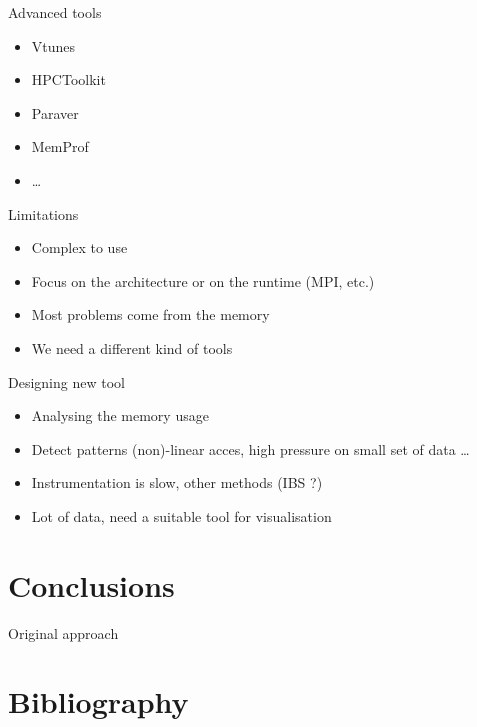 \documentclass[xcolor={usenames,dvipsnames}]{beamer}
\newcommand{\sectiontitle}{}
\newcommand{\newsection}[1]{\renewcommand{\sectiontitle}{#1}\section{#1}}
\newcommand{\newHsection}[1]{\renewcommand{\sectiontitle}{#1}\section*{#1}}
\begin{document}
\begin{frame}{Advanced tools}
    \begin{itemize}
        \item Vtunes \citep{Reinders05VTune}
        \item HPCToolkit \citep{Adhianto10HPCTOOLKIT}
        \item Paraver \citep{Pillet95PARAVER}
        \item MemProf \citep{Lachaize12MemProf}
        \item \dots
    \end{itemize}
    \pause
    \begin{alertblock}{Limitations}
        \begin{itemize}
            \item Complex to use
            \item Focus on the architecture or on the runtime (MPI, etc.)
            \item Most problems come from the memory
            \item We need a different kind of tools
        \end{itemize}
    \end{alertblock}
\end{frame}

\begin{frame}{Designing new tool}
    \begin{itemize}[<+->]
        \item Analysing the memory usage \citep{Beniamine13Cartographier}
        \item Detect patterns (non)-linear acces, high pressure on small set of data \dots
        \item Instrumentation is slow, other methods (IBS ?)
        \item Lot of data, need a suitable tool for visualisation \citep{Pagano13Trace,Dosimont14Trace}
    \end{itemize}
\end{frame}

\newsection{Conclusions}

\setcounter{finalframe}{\value{framenumber}}

\begin{frame}{Original approach}
\end{frame}




\newHsection{Bibliography}
%



\end{document}

